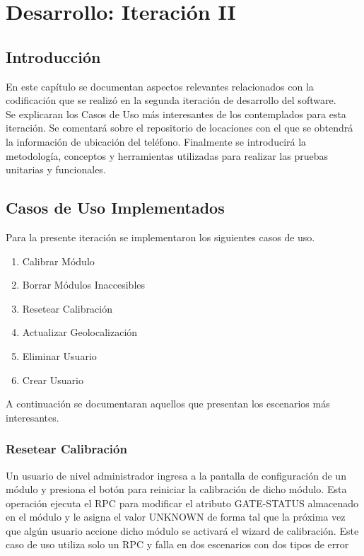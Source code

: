 
\chapter{Desarrollo: Iteración II} %

\label{Chapter7} %


\section{Introducción}
En este capítulo se documentan aspectos relevantes relacionados con la codificación que se realizó en la segunda iteración de desarrollo del software.\\
Se explicaran los Casos de Uso más interesantes de los contemplados para esta iteración.
Se comentará sobre el repositorio de locaciones con el que se obtendrá la información de ubicación del teléfono.
Finalmente se introducirá la metodología, conceptos y herramientas utilizadas para realizar las pruebas unitarias y funcionales.

\section{Casos de Uso Implementados}
Para la presente iteración se implementaron los siguientes casos de uso.
\begin{enumerate}
	\item Calibrar Módulo
	\item Borrar Módulos Inaccesibles
	\item Resetear Calibración
	\item Actualizar Geolocalización
	\item Eliminar Usuario
	\item Crear Usuario
\end{enumerate}

A continuación se documentaran aquellos que presentan los escenarios más interesantes.

\subsection{Resetear Calibración}
Un usuario de nivel administrador ingresa a la pantalla de configuración de un módulo y presiona el botón 
para reiniciar la calibración de dicho módulo.
Esta operación ejecuta el RPC para modificar el atributo GATE-STATUS almacenado en el módulo y le asigna el valor UNKNOWN
de forma tal que la próxima vez que algún usuario accione dicho módulo se activará el wizard de calibración.
Este caso de uso utiliza solo un RPC y falla en dos escenarios con dos tipos de error

